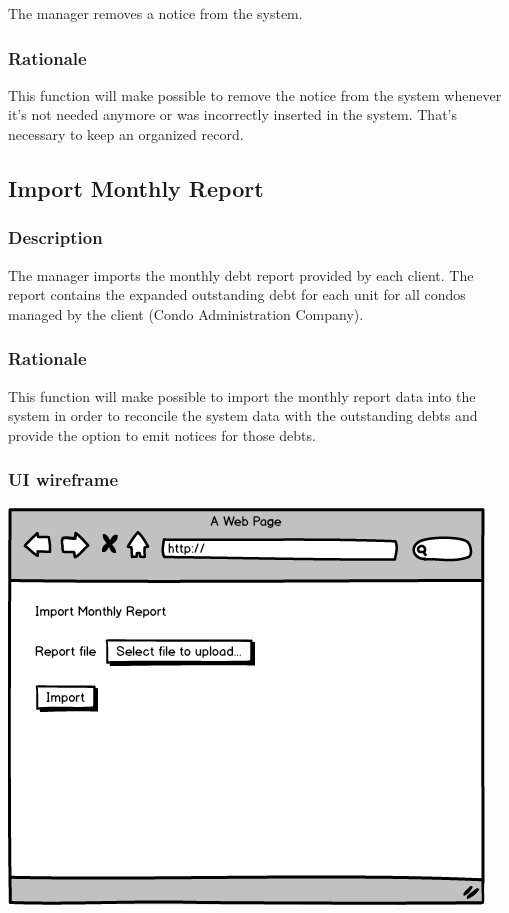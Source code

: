 \documentclass{scrreprt}
\begin{document}
The manager removes a notice from the system.

\subsubsection{Rationale}

This function will make possible to remove the notice from the system whenever it's not needed anymore or was incorrectly inserted in the system. That's necessary to keep an organized record.

\subsection{Import Monthly Report}
\subsubsection{Description}

The manager imports the monthly debt report provided by each client. The report contains the expanded outstanding debt for each unit for all condos managed by the client (Condo Administration Company).

\subsubsection{Rationale}

This function will make possible to import the monthly report data into the system in order to reconcile the system data with the outstanding debts and provide the option to emit notices for those debts.

\subsubsection{UI wireframe}
\includegraphics[scale=0.60]{mockups/importreport.png}
\end{document}
